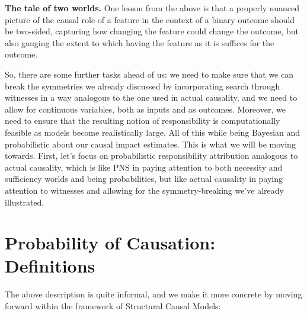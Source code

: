 \documentclass[anon,12pt]{clear2025} %
\begin{document}
\vspace{2mm}
\noindent \textbf{The tale of two worlds.} One lesson from the above is that a properly nuanced picture of the causal role of a feature in the context of a binary outcome should be two-sided, capturing how changing the feature could change the outcome, but also gauging the extent to which having the feature as it is suffices for the outcome.


So, there are some further tasks ahead of us: we need to make sure that we can break the symmetries we already discussed by incorporating search through witnesses in a way analogous to the one used in actual causality, and we need to allow for continuous variables, both as inputs and as outcomes. Moreover, we need to ensure that the resulting notion of responsibility is computationally feasible as models become realistically large. All of this while being Bayesian and probabilistic about our causal impact estimates. This is what we will be moving towards. First, let's focus on probabilistic responsibility attribution analogous to actual causality, which is like PNS in paying attention to both necessity and sufficiency worlds and being probabilities, but like actual causality in paying attention to witnesses and allowing for the symmetry-breaking we've already illustrated.







\section{Probability of Causation: Definitions} \label{sec:definitions}



The above description is quite informal, and we make it more concrete by moving forward within the framework of Structural Causal Models:
\end{document}
